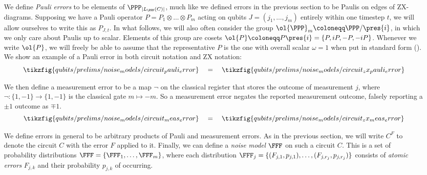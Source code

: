 We define \textit{Pauli errors} to be elements of $\PPP_{|L_\PPP(C)|}$, much like we defined errors in the previous section to be Paulis on edges of ZX-diagrams.
Supposing we have a Pauli operator $P = P_1 \otimes \ldots \otimes P_m$ acting on qubits $J = (j_1, \ldots, j_m)$ entirely within one timestep $t$, we will allow ourselves to write this as $P_{J, t}$.
In what follows, we will also often consider the group $\ol{\PPP}_{m} \coloneqq \PPP/\pres{i}$, in which we only care about Paulis up to scalar.
Elements of this group are cosets $\ol{P} \coloneqq P\pres{i} = \{P, iP, -P, -iP\}$.
Whenever we write $\ol{P}$, we will freely be able to assume that the representative $P$ is the one with overall scalar $\omega = 1$ when put in standard form ().
We show an example of a Pauli error in both circuit notation and ZX notation:
\begin{equation}
    \tikzfig{qubits/prelims/noise_models/circuit_pauli_error}
    \quad = \quad
    \tikzfig{qubits/prelims/noise_models/circuit_zx_pauli_error}
\end{equation}

We then define a measurement error to be a map $\neg$ on the classical register that stores the outcome of measurement $j$, where $\neg: \{1, -1\} \to \{1, -1\}$ is the classical gate $m \mapsto -m$.
So a measurement error negates the reported measurement outcome, falsely reporting a $\pm 1$ outcome as $\mp 1$.
\begin{equation}
    \tikzfig{qubits/prelims/noise_models/circuit_meas_error}
    \quad = \quad
    \tikzfig{qubits/prelims/noise_models/circuit_zx_meas_error}
\end{equation}

We define errors in general to be arbitrary products of Pauli and measurement errors.
As in the previous section, we will write $C^F$ to denote the circuit $C$ with the error $F$ applied to it.
Finally, we can define a \textit{noise model} $\FFF$ on such a circuit $C$.
This is a set of probability distributions $\FFF = \{\FFF_1, \ldots, \FFF_m\}$, where each distribution $\FFF_j = \{(F_{j,1}, p_{j,1}), \ldots, (F_{j,r_j}, p_{j,r_j})\}$ consists of \textit{atomic errors} $F_{j,k}$ and their probability $p_{j,k}$ of occurring.



